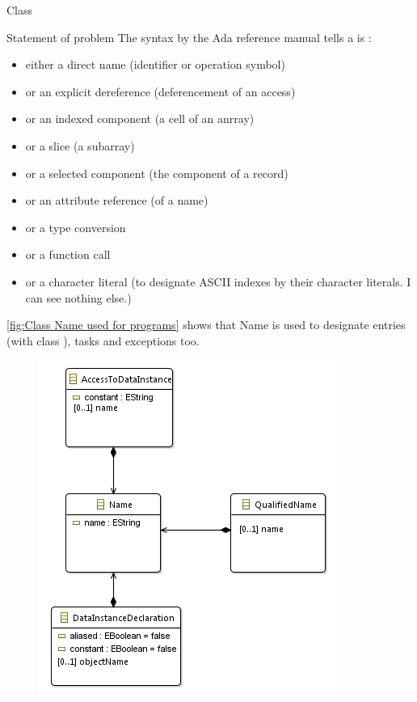 \documentclass[a4paper]{prjdoc}
\begin{document}
  \begin{asection}{Class }
     \begin{asection}{Statement of problem}
     The syntax by the Ada reference manual tells a  is :
        \begin{itemize}
        \item either a direct name       (identifier or operation symbol)
        \item or an explicit dereference (deferencement of an access)
        \item or an indexed component    (a cell of an anrray)
        \item or a slice                 (a subarray)
        \item or a selected component    (the component of a record)
        \item or an attribute reference  (of a name)
        \item or a type conversion      
        \item or a function call
        \item or a character literal     (to designate ASCII indexes by their character literals. I can see nothing else.)
        \end{itemize}
  
     \ref{fig:Class Name used for programs} shows that Name is used to designate entries (with class ), 
     tasks and exceptions too.
  
        \begin{figure}
        \includegraphics[scale=1.0]{"../../model/Class Name used for data"}
        \label{fig:Class Name used for data}
        \end{figure}
  

\end{asection}
\end{asection}
\end{document}

